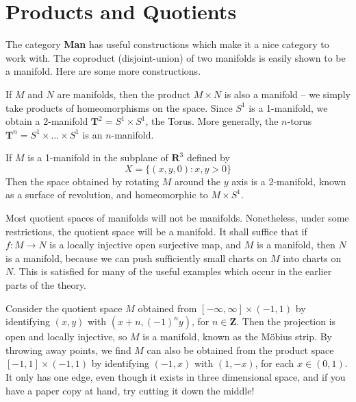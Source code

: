 \section{Products and Quotients}

The category {\bf Man} has useful constructions which make it a nice category to work with. The coproduct (disjoint-union) of two manifolds is easily shown to be a manifold. Here are some more constructions.

\begin{example}
    If $M$ and $N$ are manifolds, then the product $M \times N$ is also a manifold -- we simply take products of homeomorphisms on the space. Since $S^1$ is a 1-manifold, we obtain a 2-manifold $\mathbf{T}^2 = S^1 \times S^1$, the Torus. More generally, the $n$-torus $\mathbf{T}^n = S^1 \times \dots \times S^1$ is an $n$-manifold.
\end{example}

\begin{example}
    If $M$ is a 1-manifold in the subplane of $\mathbf{R}^3$ defined by
    \[ X = \{ (x,y,0): x,y > 0 \} \]
    Then the space obtained by rotating $M$ around the $y$ axis is a 2-manifold, known as a surface of revolution, and homeomorphic to $M \times S^1$.
\end{example}

Most quotient spaces of manifolds will not be manifolds. Nonetheless, under some restrictions, the quotient space will be a manifold. It shall suffice that if $f:M \to N$ is a locally injective open surjective map, and $M$ is a manifold, then $N$ is a manifold, because we can push sufficiently small charts on $M$ into charts on $N$. This is satisfied for many of the useful examples which occur in the earlier parts of the theory.

\begin{example}
    Consider the quotient space $M$ obtained from $[-\infty, \infty] \times (-1,1)$ by identifying $(x,y)$ with $(x + n, (-1)^n y)$, for $n \in \mathbf{Z}$. Then the projection is open and locally injective, so $M$ is a manifold, known as the M\"{o}bius strip. By throwing away points, we find $M$ can also be obtained from the product space $[-1,1] \times (-1,1)$ by identifying $(-1,x)$ with $(1,-x)$, for each $x \in (0,1)$. It only has one edge, even though it exists in three dimensional space, and if you have a paper copy at hand, try cutting it down the middle!
\end{example}

